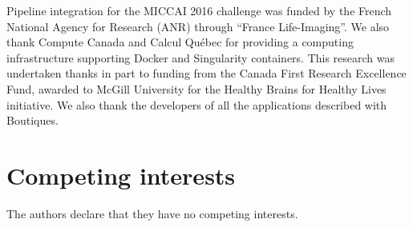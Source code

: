 \documentclass[a4paper,num-refs]{oup-contemporary}
\newcommand{\boutiques}{Boutiques\xspace}
\begin{document}
Pipeline integration for the MICCAI 2016 challenge was funded by the
French National Agency for Research (ANR) through ``France
Life-Imaging''. We also thank Compute Canada and Calcul Québec for
providing a computing infrastructure supporting Docker and Singularity
containers. This research was undertaken thanks in part to funding
from the Canada First Research Excellence Fund, awarded to McGill
University for the Healthy Brains for Healthy Lives initiative. We also
thank the developers of all the applications described with \boutiques.

\section{Competing interests}

The authors declare that they have no competing interests.


\end{document}
